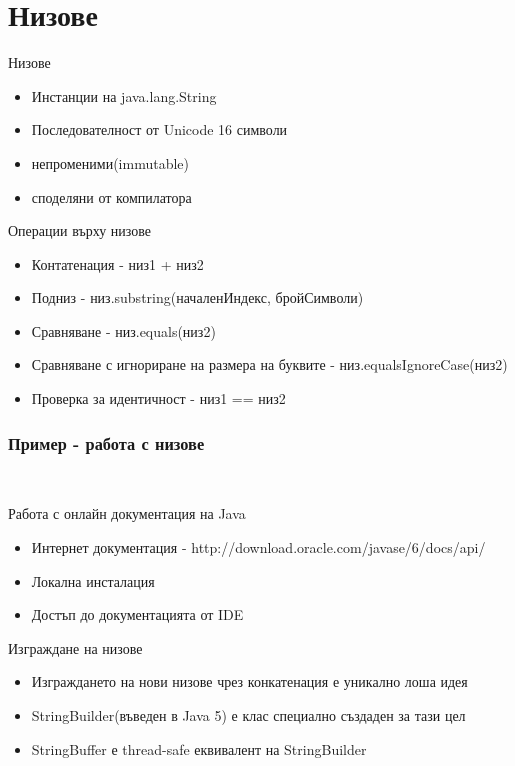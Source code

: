 \documentclass{beamer}
\begin{document}
\section{Низове}
\begin{frame}{Низове}
  \transdissolve
  \begin{itemize}
  \item Инстанции на java.lang.String
  \item Последователност от Unicode 16 символи
  \item непроменими(immutable)
  \item споделяни от компилатора
  \end{itemize}
\end{frame}

\begin{frame}{Операции върху низове}
  \transdissolve
  \begin{itemize}
  \item Контатенация - низ1 + низ2
  \item Подниз - низ.substring(началенИндекс, бройСимволи)
  \item Сравняване - низ.equals(низ2)
  \item Сравняване с игнориране на размера на буквите -
    низ.equalsIgnoreCase(низ2)
  \item Проверка за идентичност - низ1 == низ2
  \end{itemize}
\end{frame}

\begin{frame}[fragile]
  \frametitle{Пример - работа с низове}
  \transdissolve
\begin{lstlisting}
  
\end{lstlisting}
\end{frame}

\begin{frame}{Работа с онлайн документация на Java}
  \transdissolve
  \begin{itemize}
  \item Интернет документация -
    http://download.oracle.com/javase/6/docs/api/
  \item Локална инсталация
  \item Достъп до документацията от IDE
  \end{itemize}
\end{frame}

\begin{frame}{Изграждане на низове}
  \transdissolve
  \begin{itemize}
  \item Изграждането на нови низове чрез конкатенация е уникално лоша
    идея
  \item StringBuilder(въведен в Java 5) е клас специално създаден за тази цел
  \item StringBuffer е thread-safe еквивалент на StringBuilder
  \end{itemize}
\end{frame}
\end{document}

